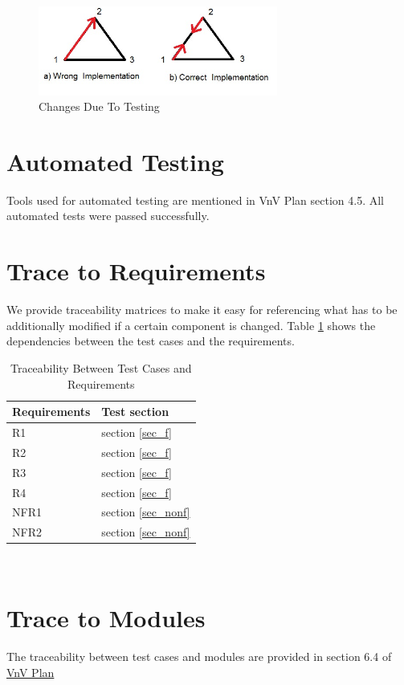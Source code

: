 \documentclass[12pt, titlepage]{article}
\begin{document}
\begin{figure}[h!]
\begin{center}
 \includegraphics[width=0.7\textwidth]{bug.jpg}
\caption{Changes Due To Testing}
\label{Fig_bug} 
\end{center}
\end{figure}
\section{Automated Testing}
Tools used for automated testing are mentioned in VnV Plan section 4.5. All automated tests were passed successfully.		
\section{Trace to Requirements}
We provide traceability matrices to make it easy for referencing 
what has to be additionally modified if a certain component is changed.
Table  \ref{Table_req} shows the dependencies between the test cases and the requirements.
\begin{table}[h!]
	\centering
	\begin{tabular}{l l} 
		\toprule		
		\textbf{Requirements} & \textbf{Test section}\\
		\midrule 
		R1 & section \ref{sec_f}\\
		R2 & section \ref{sec_f}\\
		R3 & section \ref{sec_f}\\
		R4 & section \ref{sec_f} \\
		NFR1 & section \ref{sec_nonf}\\
		NFR2 & section \ref{sec_nonf}\\
		
		\bottomrule
	\end{tabular}\\
	
	\caption{Traceability Between Test Cases and Requirements} 
	\label{Table_req}
\end{table}
	
\section{Trace to Modules}		
The traceability between test cases and modules are provided in section 6.4 of \href{https://github.com/Maryamvalian/project741/blob/cfe06182f41c842e3b44aa0eb33d661cf8a3ce79/docs/VnVPlan/VnVPlan.pdf}{VnV Plan} 
\end{document}

